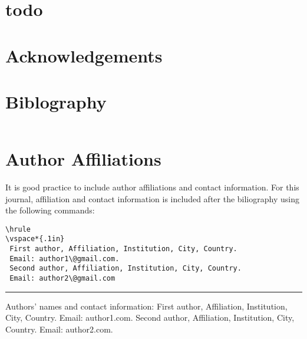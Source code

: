 \documentclass[lettersize, apacite, twoside, HRI]{apa_HRI}
\begin{document}
\section {todo}
\label{sec:Methods}


\section{Acknowledgements}

\section{Biblography}

\begin{verbatim}

\end{verbatim}




\section{Author Affiliations}
It is good practice to include author affiliations and contact information.  For this journal, affiliation and contact information is included after the biliography using the following commands:
\begin{verbatim}
\hrule
\vspace*{.1in}
 First author, Affiliation, Institution, City, Country.  
 Email: author1\@gmail.com.  
 Second author, Affiliation, Institution, City, Country.  
 Email: author2\@gmail.com
\end{verbatim}



\hrule
\vspace*{.1in}
Authors' names and contact information: First author, Affiliation, Institution, City, Country.  Email: author1\@gmail.com.  Second author, Affiliation, Institution, City, Country.  Email: author2\@gmail.com.
\end{document}
